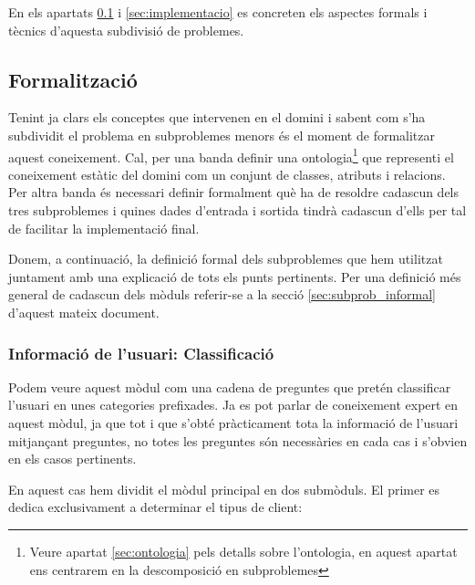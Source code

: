 \documentclass[11pt,a4paper]{article}
\begin{document}
En els apartats \ref{sec:formalitzacio} i \ref{sec:implementacio} es concreten els aspectes formals i tècnics d'aquesta subdivisió de problemes.

\subsection{Formalització}
\label{sec:formalitzacio}
Tenint ja clars els conceptes que intervenen en el domini i sabent com s'ha subdividit el problema en subproblemes menors és el moment de formalitzar aquest coneixement. Cal, per una banda definir una ontologia\footnote{Veure apartat \ref{sec:ontologia} pels detalls sobre l'ontologia, en aquest apartat ens centrarem en la descomposició en subproblemes} que representi el coneixement estàtic del domini com un conjunt de classes, atributs i relacions. Per altra banda és necessari definir formalment què ha de resoldre cadascun dels tres subproblemes i quines dades d'entrada i sortida tindrà cadascun d'ells per tal de facilitar la implementació final.

Donem, a continuació, la definició formal dels subproblemes que hem utilitzat juntament amb una explicació de tots els punts pertinents. Per una definició més general de cadascun dels mòduls referir-se a la secció \ref{sec:subprob_informal} d'aquest mateix document.

\subsubsection{Informació de l'usuari: Classificació}

Podem veure aquest mòdul com una cadena de preguntes que pretén classificar l'usuari en unes categories prefixades. Ja es pot parlar de coneixement expert en aquest mòdul, ja que tot i que s'obté pràcticament tota la informació de l'usuari mitjançant preguntes, no totes les preguntes són necessàries en cada cas i s'obvien en els casos pertinents.

En aquest cas hem dividit el mòdul principal en dos submòduls. El primer es dedica exclusivament a determinar el tipus de client:
\end{document}
